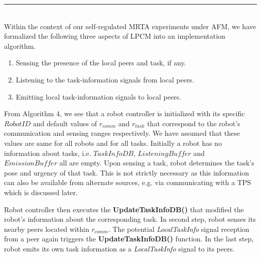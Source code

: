 \documentclass[journal]{IEEEtran}
\newcommand{\HRule}{\rule{\linewidth}{0.3mm}}
\begin{document}
\vspace{-3mm} 
\HRule\\
Within the context of our self-regulated MRTA experiments under AFM,  we have formalized the following three aspects of LPCM into an implementation algorithm. 
\begin{enumerate}
\item Sensing the presence of the local peers and task, if any.
\item Listening to the task-information signals from local peers.
\item Emitting local task-information signals to local peers.
\end{enumerate}
From Algorithm 4, we see that a robot controller is initialized with its specific $RobotID$ and default values of $r_{comm}$ and $r_{task}$ that correspond to the robot's communication and sensing ranges respectively. We have assumed that these values are same for all robots and for all tasks. Initially a robot has no information about tasks, i.e. {$TaskInfoDB$}, $ListeningBuffer$ and $EmissionBuffer$ all are empty. Upon sensing a task, robot determines the task's pose and urgency of that task. This is not strictly necessary as this information can also be available from alternate sources, e.g. via communicating with a TPS which is discussed later.

Robot controller then executes the \textbf{UpdateTaskInfoDB()} that modified the robot's information about the corresponding task. In second step, robot senses its nearby peers located within $r_{comm}$. The potential \textit{LocalTaskInfo} signal reception from a  peer again triggers the \textbf{UpdateTaskInfoDB()} function. In the last step, robot emits its own task information as a \textit{LocalTaskInfo} signal to its peers.

\end{document}
